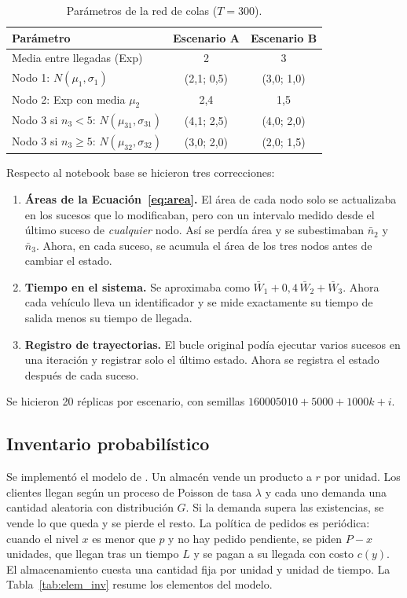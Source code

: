 \documentclass[11pt,a4paper]{article}
\begin{document}
\begin{table}[H]\centering
\caption{Parámetros de la red de colas ($T=300$).}\label{tab:param_red}
\begin{tabular}{lcc}\toprule
\textbf{Parámetro}&\textbf{Escenario A}&\textbf{Escenario B}\\\midrule
Media entre llegadas (Exp)&2&3\\
Nodo 1: $N(\mu_1,\sigma_1)$&(2,1; 0,5)&(3,0; 1,0)\\
Nodo 2: Exp con media $\mu_2$&2,4&1,5\\
Nodo 3 si $n_3<5$: $N(\mu_{31},\sigma_{31})$&(4,1; 2,5)&(4,0; 2,0)\\
Nodo 3 si $n_3\ge5$: $N(\mu_{32},\sigma_{32})$&(3,0; 2,0)&(2,0; 1,5)\\\bottomrule
\end{tabular}\end{table}

Respecto al notebook base se hicieron tres correcciones:
\begin{enumerate}[label=(\alph*)]
 \item \textbf{Áreas de la Ecuación~\eqref{eq:area}.} El área de cada nodo solo se
 actualizaba en los sucesos que lo modificaban, pero con un intervalo medido desde el último
 suceso de \emph{cualquier} nodo. Así se perdía área y se subestimaban $\bar n_2$ y
 $\bar n_3$. Ahora, en cada suceso, se acumula el área de los tres nodos antes de cambiar el
 estado.
 \item \textbf{Tiempo en el sistema.} Se aproximaba como $\bar W_1+0{,}4\,\bar W_2+\bar W_3$.
 Ahora cada vehículo lleva un identificador y se mide exactamente su tiempo de salida menos
 su tiempo de llegada.
 \item \textbf{Registro de trayectorias.} El bucle original podía ejecutar varios sucesos
 en una iteración y registrar solo el último estado. Ahora se registra el estado después de
 cada suceso.
\end{enumerate}
Se hicieron 20 réplicas por escenario, con semillas $160005010+5000+1000k+i$.

\subsection{Inventario probabilístico}
Se implementó el modelo de \cite[Sec.~5.6]{rios2008}. Un almacén vende un producto a $r$
por unidad. Los clientes llegan según un proceso de Poisson de tasa $\lambda$ y cada uno
demanda una cantidad aleatoria con distribución $G$. Si la demanda supera las existencias,
se vende lo que queda y se pierde el resto. La política de pedidos es periódica: cuando el
nivel $x$ es menor que $p$ y no hay pedido pendiente, se piden $P-x$ unidades, que llegan
tras un tiempo $L$ y se pagan a su llegada con costo $c(y)$. El almacenamiento cuesta una
cantidad fija por unidad y unidad de tiempo. La Tabla~\ref{tab:elem_inv} resume los
elementos del modelo.
\end{document}
